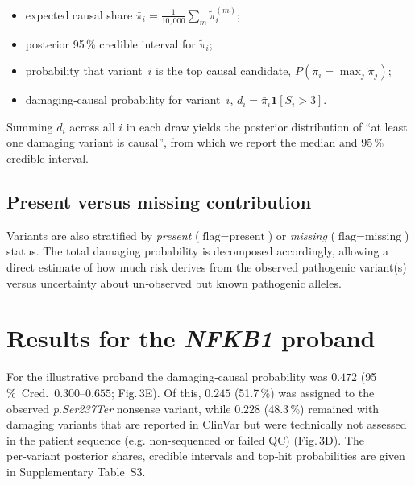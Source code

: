 \begin{itemize}
  \item expected causal share
        $\bar{\pi}_i=\frac1{10{,}000}\sum_m\tilde{\pi}_{i}^{(m)}$;
  \item posterior 95\,\% credible interval for $\tilde{\pi}_i$;
  \item probability that variant~$i$ is the top causal candidate,
        $P(\tilde{\pi}_i=\max_j\tilde{\pi}_j)$;
  \item damaging‑causal probability for variant~$i$,
        $d_i=\bar{\pi}_i\mathbf{1}[S_i>3]$.
\end{itemize}

Summing $d_i$ across all $i$ in each draw yields the posterior
distribution of “at least one damaging variant is causal”, from which
we report the median and 95\,\% credible interval.

\subsection{Present versus missing contribution}

Variants are also stratified by
\textit{present} ($\text{flag}=\text{present}$) or
\textit{missing} ($\text{flag}=\text{missing}$) status.
The total damaging probability is decomposed accordingly,
allowing a direct estimate of how much risk derives from the
observed pathogenic variant(s) versus uncertainty about un‑observed but
known pathogenic alleles.


\section{Results for the \textit{NFKB1} proband}

For the illustrative proband the damaging‑causal probability was
$0.472$ (95\,\%~Cred.\ $0.300$–$0.655$;
Fig.\,3E).  Of this, $0.245$ (51.7\,\%) was assigned to the observed
\textit{p.Ser237Ter} nonsense variant, while $0.228$
(48.3\,\%) remained with damaging variants that are reported in
ClinVar but were technically not assessed in the patient sequence (e.g. non-sequenced or failed QC)
(Fig.\,3D).  The per‑variant posterior shares, credible intervals and
top‑hit probabilities are given in Supplementary Table~S3.

